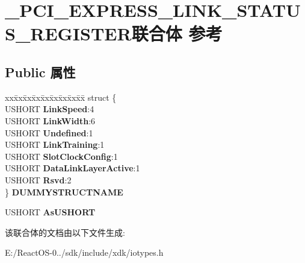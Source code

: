 \hypertarget{union___p_c_i___e_x_p_r_e_s_s___l_i_n_k___s_t_a_t_u_s___r_e_g_i_s_t_e_r}{}\section{\+\_\+\+P\+C\+I\+\_\+\+E\+X\+P\+R\+E\+S\+S\+\_\+\+L\+I\+N\+K\+\_\+\+S\+T\+A\+T\+U\+S\+\_\+\+R\+E\+G\+I\+S\+T\+E\+R联合体 参考}
\label{union___p_c_i___e_x_p_r_e_s_s___l_i_n_k___s_t_a_t_u_s___r_e_g_i_s_t_e_r}
\subsection*{Public 属性}
\begin{DoxyCompactItemize}
\item 
\mbox{\label{union___p_c_i___e_x_p_r_e_s_s___l_i_n_k___s_t_a_t_u_s___r_e_g_i_s_t_e_r_aaebe1e6879bb2f23858e0abeb6136a08}} 
\begin{tabbing}
xx\=xx\=xx\=xx\=xx\=xx\=xx\=xx\=xx\=\kill
struct \{\\
\>USHORT {\bfseries LinkSpeed}:4\\
\>USHORT {\bfseries LinkWidth}:6\\
\>USHORT {\bfseries Undefined}:1\\
\>USHORT {\bfseries LinkTraining}:1\\
\>USHORT {\bfseries SlotClockConfig}:1\\
\>USHORT {\bfseries DataLinkLayerActive}:1\\
\>USHORT {\bfseries Rsvd}:2\\
\} {\bfseries DUMMYSTRUCTNAME}\\

\end{tabbing}\item 
\mbox{\label{union___p_c_i___e_x_p_r_e_s_s___l_i_n_k___s_t_a_t_u_s___r_e_g_i_s_t_e_r_a3d34af9b4d1b6a7661a4d7a6d8d712f8}} 
U\+S\+H\+O\+RT {\bfseries As\+U\+S\+H\+O\+RT}
\end{DoxyCompactItemize}


该联合体的文档由以下文件生成\+:\begin{DoxyCompactItemize}
\item 
E\+:/\+React\+O\+S-\/0../sdk/include/xdk/iotypes.\+h\end{DoxyCompactItemize}
